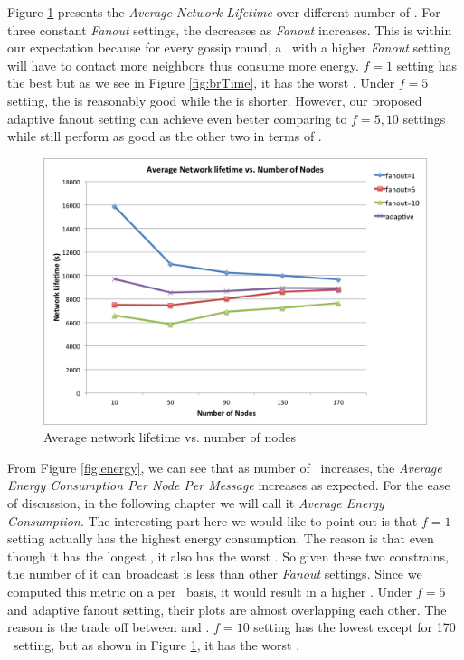 Figure \ref{fig:life} presents the \emph{Average Network Lifetime} over different number of \gns. For three constant \emph{Fanout} settings, the \emph{\anl} decreases as \emph{Fanout} increases. This is within our expectation because for every gossip round, a \gn ~with a higher \emph{Fanout} setting will have to contact more neighbors thus consume more energy. $f=1$ setting has the best \emph{\anl} but as we see in Figure \ref{fig:brTime}, it has the worst \emph{\ambt}. Under $f=5$ setting, the \emph{\anl} is reasonably good while the \emph{\ambt} is shorter. However, our proposed adaptive fanout setting can achieve even better \emph{\anl} comparing to $f=5,10$ settings while still perform as good as the other two in terms of \emph{\ambt}. 

\begin{figure} 
	\centering
	\includegraphics[width=5.5in]{life.png}
	\caption{Average network lifetime vs. number of nodes}
	\label{fig:life}
\end{figure}

From Figure \ref{fig:energy}, we can see that as number of \gns ~increases, the \emph{Average Energy Consumption Per Node Per Message} increases as expected. For the ease of discussion, in the following chapter we will call it \emph{Average Energy Consumption}. The interesting part here we would like to point out is that $f=1$ setting actually has the highest energy consumption. The reason is that even though it has the longest \emph{\anl}, it also has the worst \emph{\ambt}. So given these two constrains, the number of \msgs it can broadcast is less than other \emph{Fanout} settings. Since we computed this metric on a per \msg ~basis, it would result in a higher \emph{\aec}. Under $f=5$ and adaptive fanout setting, their \emph{\aec} plots are almost overlapping each other. The reason is the trade off between \emph{\ambt} and \emph{\anl}. $f=10$ setting has the lowest \emph{\aec} except for 170 \gns ~setting, but as shown in Figure \ref{fig:life}, it has the worst \emph{\anl}. 

